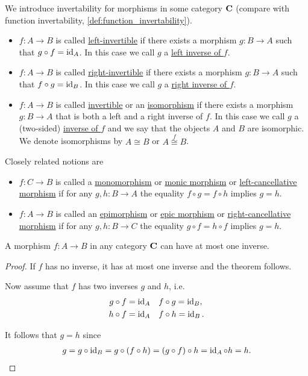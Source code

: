 \begin{definition}[Invertability]\label{def:morphism_invertability}
  We introduce invertability for morphisms in some category $\operatorname{\mathbf{C}}$ (compare with function invertability, \cref{def:function_invertability}).

  \begin{itemize}
    \item $f: A \to B$ is called \uline{left-invertible} if there exists a morphism $g: B \to A$ such that $g \circ f = \operatorname{id}_A$. In this case we call $g$ a \uline{left inverse of $f$}.

    \item $f: A \to B$ is called \uline{right-invertible} if there exists a morphism $g: B \to A$ such that $f \circ g = \operatorname{id}_B$. In this case we call $g$ a \uline{right inverse of $f$}.

    \item $f: A \to B$ is called \uline{invertible} or an \uline{isomorphism} if there exists a morphism $g: B \to A$ that is both a left and a right inverse of $f$. In this case we call $g$ a (two-sided) \uline{inverse of $f$} and we say that the objects $A$ and $B$ are isomorphic. We denote isomorphisms by $A \cong B$ or $A \overset f \cong B$.
  \end{itemize}

  Closely related notions are
  \begin{itemize}
    \item $f: C \to B$ is called a \uline{monomorphism} or \uline{monic morphism} or \uline{left-cancellative morphism} if for any $g, h: B \to A$ the equality $f \circ g = f \circ h$ implies $g = h$.
    \item $f: A \to B$ is called an \uline{epimorphism} or \uline{epic morphism} or \uline{right-cancellative morphism} if for any $g, h: B \to C$ the equality $g \circ f = h \circ f$ implies $g = h$.
  \end{itemize}
\end{definition}

\begin{proposition}\label{ex:at_most_one_isomorphism}\cite[exercise 1.1.13]{Leinster2014}
  A morphism $f: A \to B$ in any category $\operatorname{\mathbf{C}}$ can have at most one inverse.
\end{proposition}
\begin{proof}
  If $f$ has no inverse, it has at most one inverse and the theorem follows.

  Now assume that $f$ has two inverses $g$ and $h$, i.e.
  \begin{align*}
    g \circ f = \operatorname{id}_A && &f \circ g = \operatorname{id}_B,
    \\
    h \circ f = \operatorname{id}_A && &f \circ h = \operatorname{id}_B.
  \end{align*}

  It follows that $g = h$ since
  \begin{align*}
    g
    =
    g \circ \operatorname{id}_B
    =
    g \circ (f \circ h)
    =
    (g \circ f) \circ h
    =
    \operatorname{id}_A \circ h
    =
    h.
  \end{align*}
\end{proof}

